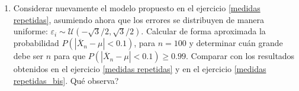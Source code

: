 \documentclass[a4paper, 11pt]{article}
\begin{document}
\begin{enumerate}
%
%
%
%


\item Considerar nuevamente el modelo propuesto en el ejercicio
\ref{medidas repetidas}, asumiendo ahora que los errores se 
distribuyen de manera uniforme: $\varepsilon_{i}\sim
\mathcal{U}(-\sqrt{3}/2,\sqrt{3}/2)$. Calcular de forma aproximada la
probabilidad $P\left(  |\overline{X}_{n}-\mu|<0.1\right)  $, para $n=100$ y
determinar cu\'an grande debe ser $n$ para que $P\left(  |\overline{X}_{n}%
-\mu|<0.1\right)  \geq0.99$. Comparar con los resultados obtenidos en  el 
ejercicio \ref{medidas repetidas} y en el ejercicio \ref{medidas repetidas_bis}. 
\textquestiondown Qu\'e observa?



\end{enumerate}
\end{document}
